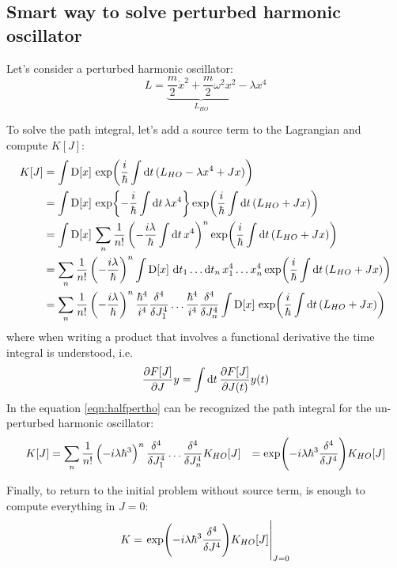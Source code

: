 \documentclass[main.tex]{subfiles}
\begin{document}
\subsection{Smart way to solve perturbed harmonic oscillator}
Let's consider a perturbed harmonic oscillator:
\begin{equation}
L = \underbrace{\frac{m}{2}\dot{x}^2 + \frac{m}{2}\omega^2x^2}_{L_{HO}} - \lambda x^4
\end{equation}

To solve the path integral, let's add a source term to the Lagrangian and compute $K[J]$:
\begin{align}
K[J] &= \int \DD{x} \exp( \frac{i}{\hbar} \int \dd{t} (L_{HO} - \lambda x^4 + Jx ) ) \\
&= \int \DD{x} \exp{ -\frac{i}{\hbar} \int \dd{t} \lambda x^4} \exp( \frac{i}{\hbar} \int \dd{t} (L_{HO} + Jx ) ) \\
&= \int \DD{x} \sum_n \frac{1}{n!} \left( -\frac{i\lambda}{\hbar} \int \dd{t} x^4 \right)^n \exp( \frac{i}{\hbar} \int \dd{t} (L_{HO} + Jx ) ) \\
&= \sum_n \frac{1}{n!} \left( -\frac{i\lambda}{\hbar} \right)^n \int \DD{x} \dd{t_1} \dots \dd{t_n} x_1^4 \dots x_n^4 \exp( \frac{i}{\hbar} \int \dd{t} (L_{HO} + Jx ) ) \\
&= \sum_n \frac{1}{n!} \left( -\frac{i\lambda}{\hbar} \right)^n \frac{\hbar^4}{i^4}\fdv[4]{J_1}\dots\frac{\hbar^4}{i^4}\fdv[4]{J_n} \int \DD{x} \exp( \frac{i}{\hbar} \int \dd{t} (L_{HO} + Jx ) ) \label{eqn:halfpertho}
\end{align}
where when writing a product that involves a functional derivative the time integral is understood, i.e.
\begin{equation}
\pdv{F[J]}{J} y = \int \dd{t} \pdv{F[J]}{J(t)} y(t)
\end{equation}
In the equation \eqref{eqn:halfpertho} can be recognized the path integral for the un-perturbed harmonic oscillator:
\begin{align}
K[J] &= \sum_n \frac{1}{n!} \left( -i\lambda\hbar^3 \right)^n \fdv[4]{J_1}\dots\fdv[4]{J_n} K_{HO}[J]
&= \exp( -i\lambda\hbar^3 \fdv[4]{J} ) K_{HO}[J]
\end{align}

Finally, to return to the initial problem without source term, is enough to compute everything in $J=0$:
\begin{equation}
K = \eval{ \exp( -i\lambda\hbar^3 \fdv[4]{J} ) K_{HO}[J] }_{J=0}
\end{equation}
\end{document}
